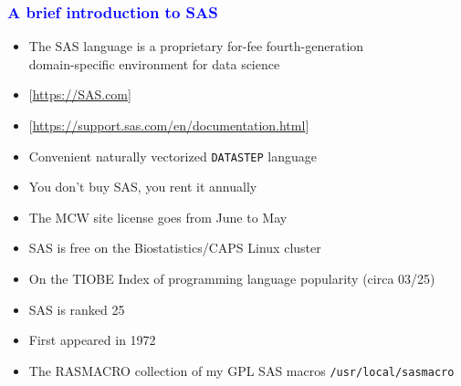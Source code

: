 \documentclass[11pt,pdftex,dvipsnames,usenames]{beamer}
\begin{document}
\begin{frame}[fragile]\frametitle{\bf\textcolor{blue}{A brief introduction to SAS}}

\begin{itemize}
\item The SAS language is a proprietary for-fee fourth-generation\\ domain-specific environment for data science
\item \textcolor{PineGreen}{[\href{https://SAS.com}{https://SAS.com}]}
\item \textcolor{PineGreen}{[\href{https://support.sas.com/en/documentation.html}{https://support.sas.com/en/documentation.html}]}
\item Convenient naturally vectorized \texttt{DATASTEP} language 
\item You don't buy SAS, you rent it annually
\item The MCW site license goes from June to May
\item SAS is free on the Biostatistics/CAPS Linux cluster
\item On the TIOBE Index of programming language popularity (circa 03/25)
\item SAS is ranked 25 
\item First appeared in 1972
\item The RASMACRO collection of my GPL SAS macros 
\texttt{/usr/local/sasmacro}
\end{itemize}

\end{frame}
\end{document}
